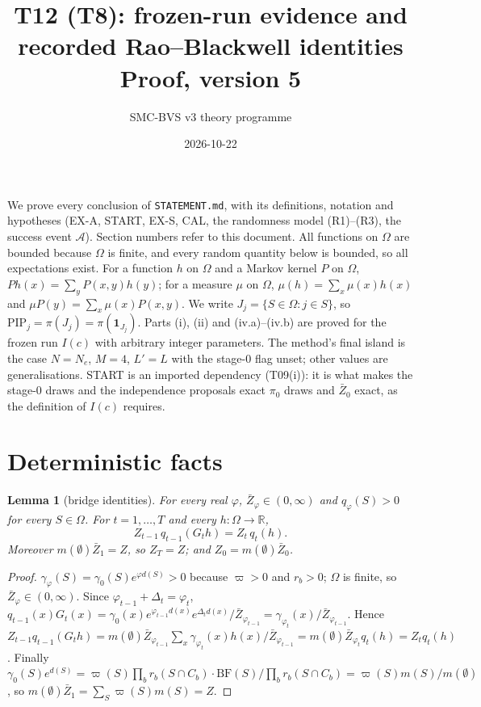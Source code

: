 \documentclass[11pt]{article}
\title{T12 (T8): frozen-run evidence and recorded Rao--Blackwell identities\\[2pt] \large Proof, version 5}
\author{SMC-BVS v3 theory programme}
\date{2026-10-22}
\newtheorem{lemma}{Lemma}[section]
\theoremstyle{remark}
\newcommand{\R}{\mathbb{R}}
\newcommand{\cA}{\mathcal{A}}
\newcommand{\PIP}{\mathrm{PIP}}
\newcommand{\Zb}{\bar Z}
\newcommand{\ind}{\mathbf 1}
\newcommand{\Om}{\Omega}
\begin{document}
\maketitle

\noindent We prove every conclusion of \texttt{STATEMENT.md}, with its definitions, notation and hypotheses (EX-A, START, EX-S, CAL, the randomness model (R1)--(R3), the success event $\cA$). Section numbers refer to this document. All functions on $\Om$ are bounded because $\Om$ is finite, and every random quantity below is bounded, so all expectations exist. For a function $h$ on $\Om$ and a Markov kernel $P$ on $\Om$, $Ph(x)=\sum_y P(x,y)h(y)$; for a measure $\mu$ on $\Om$, $\mu(h)=\sum_x\mu(x)h(x)$ and $\mu P(y)=\sum_x\mu(x)P(x,y)$. We write $J_j=\{S\in\Om: j\in S\}$, so $\PIP_j=\pi(J_j)=\pi(\ind_{J_j})$. Parts (i), (ii) and (iv.a)--(iv.b) are proved for the frozen run $I(c)$ with arbitrary integer parameters. The method's final island is the case $N=N_e$, $M=4$, $L'=L$ with the stage-0 flag unset; other values are generalisations. START is an imported dependency (T09(i)): it is what makes the stage-0 draws and the independence proposals exact $\pi_0$ draws and $\Zb_0$ exact, as the definition of $I(c)$ requires.

\section{Deterministic facts}

\begin{lemma}[bridge identities]\label{lem:bridge}
For every real $\varphi$, $\Zb_\varphi\in(0,\infty)$ and $q_\varphi(S)>0$ for every $S\in\Om$. For $t=1,\dots,T$ and every $h:\Om\to\R$,
\[ Z_{t-1}\,q_{t-1}(G_t h)=Z_t\,q_t(h). \]
Moreover $m(\emptyset)\Zb_1=Z$, so $Z_T=Z$; and $Z_0=m(\emptyset)\Zb_0$.
\end{lemma}
\begin{proof}
$\gamma_\varphi(S)=\gamma_0(S)e^{\varphi d(S)}>0$ because $\varpi>0$ and $r_b>0$; $\Om$ is finite, so $\Zb_\varphi\in(0,\infty)$. Since $\varphi_{t-1}+\Delta_t=\varphi_t$,
$q_{t-1}(x)G_t(x)=\gamma_0(x)e^{\varphi_{t-1}d(x)}e^{\Delta_t d(x)}/\Zb_{\varphi_{t-1}}=\gamma_{\varphi_t}(x)/\Zb_{\varphi_{t-1}}$. Hence
$Z_{t-1}q_{t-1}(G_th)=m(\emptyset)\Zb_{\varphi_{t-1}}\sum_x \gamma_{\varphi_t}(x)h(x)/\Zb_{\varphi_{t-1}}=m(\emptyset)\Zb_{\varphi_t}q_t(h)=Z_tq_t(h)$.
Finally $\gamma_0(S)e^{d(S)}=\varpi(S)\prod_b r_b(S\cap C_b)\cdot \mathrm{BF}(S)/\prod_b r_b(S\cap C_b)=\varpi(S)m(S)/m(\emptyset)$, so $m(\emptyset)\Zb_1=\sum_S\varpi(S)m(S)=Z$.
\end{proof}
\end{document}
